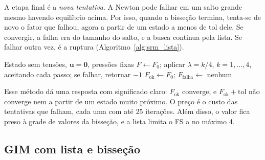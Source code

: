 \documentclass[11pt,a4paper]{article}
\numberwithin{equation}{section}
\begin{document}
A etapa final é a \emph{nova tentativa}. A Newton pode falhar em um salto grande mesmo havendo equilíbrio acima. Por isso, quando a bisseção termina, tenta-se de
novo o fator que falhou, agora a partir de um estado a menos de $\mathrm{tol}$ dele. Se convergir, a falha era do tamanho do salto, e a busca continua pela lista. Se
falhar outra vez, é a ruptura (Algoritmo~\ref{alg:srm_lista}).

\begin{algorithm}[htbp]
\caption{SRM com lista, bisseção e nova tentativa (\texttt{FactorSRM})}\label{alg:srm_lista}
Estado sem tensões, $\mathbf{u}=\mathbf{0}$, pressões fixas\;
$F \leftarrow F_0$; aplicar $\lambda = k/4$, $k=1,\dots,4$, aceitando cada passo; se falhar, retornar $-1$\;
$F_{\mathrm{ok}} \leftarrow F_0$; $F_{\mathrm{falha}} \leftarrow$ nenhum\;
\end{algorithm}

Esse método dá uma resposta com significado claro: $F_{\mathrm{ok}}$ converge, e $F_{\mathrm{ok}} + \mathrm{tol}$ não converge nem a partir de um estado muito próximo. O preço é o
custo das tentativas que falham, cada uma com até 25 iterações. Além disso, o valor fica preso à grade de valores da bisseção, e a lista limita o FS a no máximo 4.

\subsection{GIM com lista e bisseção}\label{sec:gim_lista}
\end{document}
